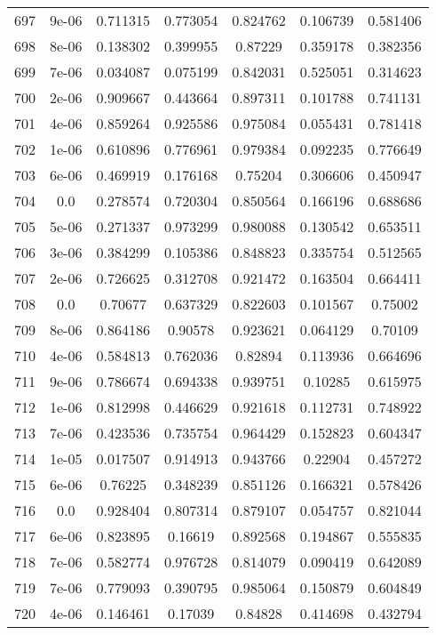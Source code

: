 \begin{table}
\begin{tabular*}{\linewidth}{c|c|c|c|c|c|c}
697 & 9e-06 & 0.711315 & 0.773054 & 0.824762 & 0.106739 & 0.581406\\
698 & 8e-06 & 0.138302 & 0.399955 & 0.87229 & 0.359178 & 0.382356\\
699 & 7e-06 & 0.034087 & 0.075199 & 0.842031 & 0.525051 & 0.314623\\
700 & 2e-06 & 0.909667 & 0.443664 & 0.897311 & 0.101788 & 0.741131\\
701 & 4e-06 & 0.859264 & 0.925586 & 0.975084 & 0.055431 & 0.781418\\
702 & 1e-06 & 0.610896 & 0.776961 & 0.979384 & 0.092235 & 0.776649\\
703 & 6e-06 & 0.469919 & 0.176168 & 0.75204 & 0.306606 & 0.450947\\
704 & 0.0 & 0.278574 & 0.720304 & 0.850564 & 0.166196 & 0.688686\\
705 & 5e-06 & 0.271337 & 0.973299 & 0.980088 & 0.130542 & 0.653511\\
706 & 3e-06 & 0.384299 & 0.105386 & 0.848823 & 0.335754 & 0.512565\\
707 & 2e-06 & 0.726625 & 0.312708 & 0.921472 & 0.163504 & 0.664411\\
708 & 0.0 & 0.70677 & 0.637329 & 0.822603 & 0.101567 & 0.75002\\
709 & 8e-06 & 0.864186 & 0.90578 & 0.923621 & 0.064129 & 0.70109\\
710 & 4e-06 & 0.584813 & 0.762036 & 0.82894 & 0.113936 & 0.664696\\
711 & 9e-06 & 0.786674 & 0.694338 & 0.939751 & 0.10285 & 0.615975\\
712 & 1e-06 & 0.812998 & 0.446629 & 0.921618 & 0.112731 & 0.748922\\
713 & 7e-06 & 0.423536 & 0.735754 & 0.964429 & 0.152823 & 0.604347\\
714 & 1e-05 & 0.017507 & 0.914913 & 0.943766 & 0.22904 & 0.457272\\
715 & 6e-06 & 0.76225 & 0.348239 & 0.851126 & 0.166321 & 0.578426\\
716 & 0.0 & 0.928404 & 0.807314 & 0.879107 & 0.054757 & 0.821044\\
717 & 6e-06 & 0.823895 & 0.16619 & 0.892568 & 0.194867 & 0.555835\\
718 & 7e-06 & 0.582774 & 0.976728 & 0.814079 & 0.090419 & 0.642089\\
719 & 7e-06 & 0.779093 & 0.390795 & 0.985064 & 0.150879 & 0.604849\\
720 & 4e-06 & 0.146461 & 0.17039 & 0.84828 & 0.414698 & 0.432794\\
\end{tabular*}
\end{table}
